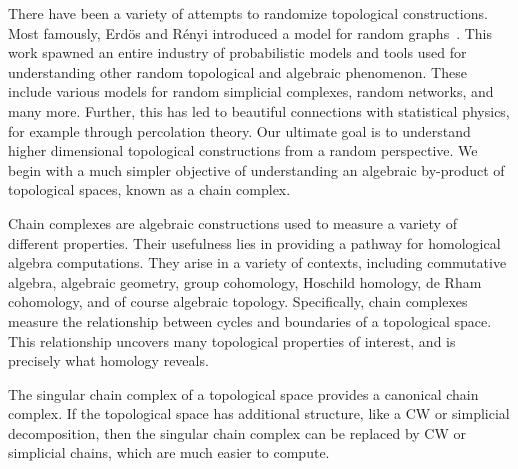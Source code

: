 There have been a variety of attempts to randomize topological constructions.
Most famously, Erd\"os and R\'enyi introduced a model for random
graphs~\cite{erdos_random_1959, erdos_evolution_1960}.  This work spawned an
entire industry of probabilistic models and tools used for understanding other
random topological and algebraic phenomenon. These include various models for
random simplicial complexes, random networks, and many more. Further, this has
led to beautiful connections with statistical physics, for example through
percolation theory.  Our ultimate goal 
is to understand higher dimensional topological constructions from a random perspective. We 
begin with a much simpler objective of understanding an algebraic
by-product of topological spaces, known as a chain complex. 

Chain complexes are algebraic constructions used to measure a variety of
different properties. Their usefulness lies in providing a pathway for
homological algebra computations. They arise in a variety of contexts,
including commutative algebra, algebraic geometry, group cohomology, Hoschild homology, de Rham
cohomology, and of course algebraic topology. Specifically, chain
complexes measure the relationship between cycles and boundaries of a
topological space. This relationship uncovers many topological properties of
interest, and is precisely what homology reveals. 

The singular chain complex of a topological space provides a canonical
chain complex.
If the topological space has additional structure, like a CW or 
simplicial decomposition, then the singular chain complex can be replaced
by CW or simplicial chains, which are much easier to compute.



%



